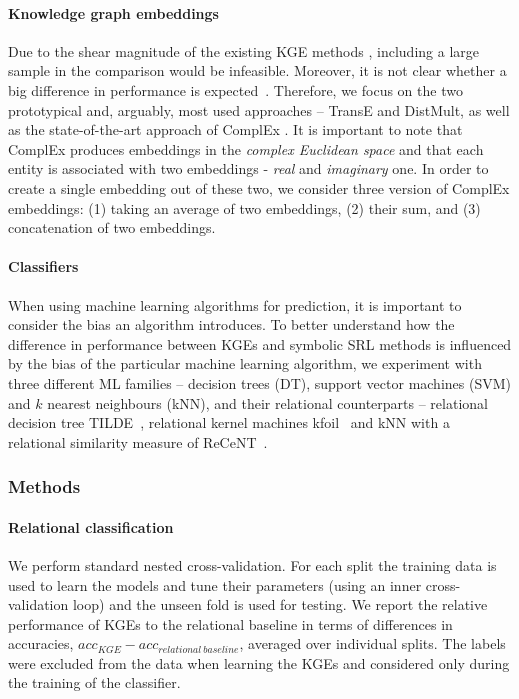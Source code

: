 \paragraph{Knowledge graph embeddings}
Due to the shear magnitude of the existing KGE methods \cite{EmbeddingsOverview}, including a large sample in the comparison would be infeasible.
Moreover, it is not clear whether a big difference in performance is expected~\cite{DBLP:conf/rep4nlp/KadlecBK17}.
Therefore, we focus on the two prototypical and, arguably, most used approaches -- TransE and DistMult, as well as the state-of-the-art approach of ComplEx \cite{trouillon2016complex}.
It is important to note that ComplEx produces embeddings in the \textit{complex Euclidean space} and that each entity is associated with two embeddings - \textit{real} and \textit{imaginary} one.
In order to create a single embedding out of these two, we consider three version of ComplEx embeddings: (1) taking an average of two embeddings, (2) their sum, and (3) concatenation of two embeddings.




\paragraph{Classifiers}
When using machine learning algorithms for prediction, it is important to consider the bias an algorithm introduces.
To better understand how the difference in performance between KGEs and symbolic SRL methods is influenced by the bias of the particular machine learning algorithm, we experiment with three different ML families -- decision trees (DT), support vector machines (SVM) and $k$ nearest neighbours (kNN), and their relational counterparts -- relational decision tree TILDE~\cite{Blockeel1998285}, relational kernel machines \gls{kfoil}~\cite{Landwehr:2006:KLS:1597538.1597601} and kNN with a relational similarity measure of ReCeNT~\cite{DumancicMLJ2017}.










\subsubsection{Methods}


\paragraph{Relational classification}
We perform standard nested cross-validation. 
For each split the training data is used to learn the models and tune their parameters (using an inner cross-validation loop) and the unseen fold is used for testing.
We report the relative performance of KGEs to the relational baseline in terms of differences in accuracies, $acc_{KGE} - acc_{relational~ baseline}$, averaged over individual splits. 
The labels were excluded from the data when learning the KGEs and considered only during the training of the classifier.


